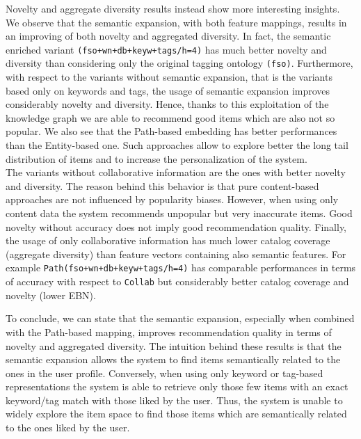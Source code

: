Novelty and aggregate diversity results instead show more interesting insights. We observe that the semantic expansion, with both feature mappings, results in an improving of both novelty and aggregated diversity. In fact, the semantic enriched variant \texttt{(fso+wn+db+keyw+tags/h=4)} has much better novelty and diversity than considering only the original tagging ontology \texttt{(fso)}. Furthermore, with respect to the variants without semantic expansion, that is the variants based only on keywords and tags, the usage of semantic expansion improves considerably novelty and diversity. Hence, thanks to this exploitation of the knowledge graph we are able to recommend good items which are also not so popular. We also see that the Path-based embedding has better performances than the Entity-based one. 
Such approaches allow to explore better the long tail distribution of items and to increase the personalization of the system. 
\\The variants without collaborative information are the ones with better novelty and diversity. The reason behind this behavior is that pure content-based approaches are not influenced by popularity biases. However, when using only content data the system recommends unpopular but very inaccurate items. Good novelty without accuracy does not imply good recommendation quality. 
Finally, the usage of only collaborative information has much lower catalog coverage (aggregate diversity) than feature vectors containing also semantic features. For example \texttt{Path(fso+wn+db+keyw+tags/h=4)} has comparable performances in terms of accuracy with respect to \texttt{Collab} but considerably better catalog coverage and novelty (lower EBN). 

To conclude, we can state that the semantic expansion, especially when combined with the Path-based mapping, improves recommendation quality in terms of novelty and aggregated diversity. The intuition behind these results is that the semantic expansion allows the system to find items semantically related to the ones in the user profile. Conversely, when using only keyword or tag-based representations the system is able to retrieve only those few items with an exact keyword/tag match with those liked by the user. Thus, the system is unable to widely explore the item space to find those items which are semantically related to the ones liked by the user.
